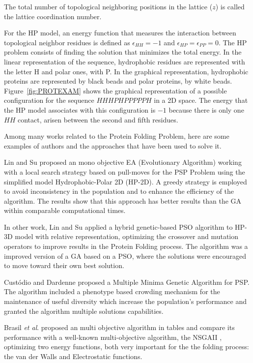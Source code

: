 The total number of topological neighboring positions in the lattice ($z$) is called the lattice coordination number.


For the HP model, an energy function that  measures the interaction between topological  neighbor residues is defined  as  $\epsilon_{HH}=-1$ and $\epsilon_{HP}=\epsilon_{PP}=0$. The HP problem consists of finding the solution that minimizes the total energy. In the linear representation of the sequence, hydrophobic residues are represented with the letter H and polar ones, with P. In the graphical representation, hydrophobic proteins are represented  by black beads and polar proteins, by white beads. Figure~\ref{fig:PROTEXAM} shows the graphical representation of a possible configuration for  the sequence  $HHHPHPPPPPH$ in a 2D space. The energy that the HP model associates with this configuration is $-1$ because there is only one $HH$ contact, arisen between the second and fifth residues.


Among many works related to the Protein Folding Problem, here are some examples of authors and the approaches that have been used to solve it.


Lin and Su \cite{li2012genetic} proposed an mono objective EA (Evolutionary Algorithm) working with a local search strategy based on pull-moves for the PSP Problem using the simplified model Hydrophobic-Polar 2D (HP-2D). A greedy strategy is employed to avoid inconsistency in the population and to enhance the efficiency of the algorithm. The results show that this approach has better results than the GA within comparable computational times.


In other work, Lin and Su \cite{lin2011protein} applied a hybrid genetic-based PSO algorithm to HP-3D model with relative representation, optimizing the crossover and mutation operators to improve results in the Protein Folding process. The algorithm was a improved version of a GA based on a PSO, where the solutions were encouraged to move toward their own best solution.


Cust\'{o}dio and Dardenne \cite{custodio2014multiple} proposed a Multiple Minima Genetic Algorithm for PSP. The algorithm included a phenotype based crowding mechanism for the maintenance of useful diversity which increase the population's performance and granted the algorithm multiple solutions capabilities.


Brasil \textit{et al}.\cite{soares2011investigating} proposed an multi objective algorithm in tables and compare its performance with a well-known multi-objective algorithm, the NSGAII \cite{deb2002fast}, optimizing two energy functions, both very important for the the folding process: the van der Walls and Electrostatic functions.


